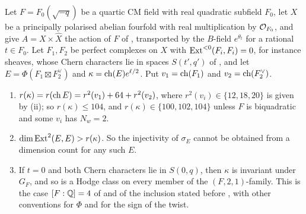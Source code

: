 \begin{theorem}
\label{thm:quarticobstruction}
Let $F=F_{0}(\sqrt{-q})$ be a quartic CM field with real quadratic subfield
$F_{0}$, let $X$ be a principally polarised abelian fourfold with real
multiplication by $\mathcal{O}_{F_{0}}$, and give $A=X\times\widehat X$ the action of
$F$ of \cite[\S11.1]{Mar25c}, transported by the $B$-field $e^{\theta_{t}}$ for a
rational $t\in F_{0}$. Let $F_{1},F_{2}$
be perfect complexes on $X$ with $\operatorname{Ext}^{<0}(F_{i},F_{i})=0$, for instance
sheaves, whose Chern characters lie in spaces $S(t',q')$ of
, and let $E=\Phi(F_{1}\boxtimes F_{2}^{\vee})$ and
$\kappa=\operatorname{ch}(E)e^{\ell/2}$. Put $v_{1}=\operatorname{ch}(F_{1})$ and $v_{2}=\operatorname{ch}(F_{2}^{\vee})$.
\begin{enumerate}[label=\textup{(\roman*)},leftmargin=2.6em,itemsep=2pt]
\item $r(\kappa)=r(\operatorname{ch} E)=r^{2}(v_{1})+64+r^{2}(v_{2})$, where
  $r^{2}(v_{i})\in\{12,18,20\}$ is given by (ii); so
  $r(\kappa)\le104$, and $r(\kappa)\in\{100,102,104\}$ unless $F$ is
  biquadratic and some $v_{i}$ has $N_{w}=2$.
\item $\dim\operatorname{Ext}^{2}(E,E)>r(\kappa)$. So the injectivity of $\sigma_{E}$ cannot
  be obtained from a dimension count for any such $E$.
\item If $t=0$ and both Chern characters lie in $S(0,q)$, then $\kappa$ is
  invariant under $G_{F}$, and so is a Hodge class on every member of the
  $(F,2,1)$-family. This is the case $[F:\mathbb{Q}]=4$ of
  \cite[Proposition~10.2.1(1)]{Mar25c} and of the inclusion stated before
  \cite[Lemma~10.1.3]{Mar25c}, with other conventions for $\Phi$ and for the
  sign of the twist.
\end{enumerate}
\end{theorem}

